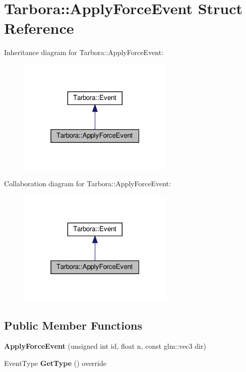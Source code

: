 \hypertarget{structTarbora_1_1ApplyForceEvent}{}\section{Tarbora\+:\+:Apply\+Force\+Event Struct Reference}
\label{structTarbora_1_1ApplyForceEvent}


Inheritance diagram for Tarbora\+:\+:Apply\+Force\+Event\+:\nopagebreak
\begin{figure}[H]
\begin{center}
\leavevmode
\includegraphics[width=211pt]{structTarbora_1_1ApplyForceEvent__inherit__graph}
\end{center}
\end{figure}


Collaboration diagram for Tarbora\+:\+:Apply\+Force\+Event\+:\nopagebreak
\begin{figure}[H]
\begin{center}
\leavevmode
\includegraphics[width=211pt]{structTarbora_1_1ApplyForceEvent__coll__graph}
\end{center}
\end{figure}
\subsection*{Public Member Functions}
\begin{DoxyCompactItemize}
\item 
\mbox{\label{structTarbora_1_1ApplyForceEvent_a75d2dede75fce6fbdf3e2874327cb88e}} 
{\bfseries Apply\+Force\+Event} (unsigned int id, float n, const glm\+::vec3 dir)
\item 
\mbox{\label{structTarbora_1_1ApplyForceEvent_ab5a01e837a0658da5199f2398eb57af9}} 
Event\+Type {\bfseries Get\+Type} () override
\end{DoxyCompactItemize}
